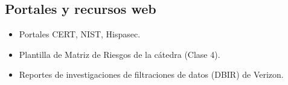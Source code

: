 \documentclass[11pt,a4paper]{article}
\begin{document}
\subsection{Portales y recursos web}
\begin{itemize}[leftmargin=*]
  \item Portales CERT, NIST, Hispasec.
  \item Plantilla de Matriz de Riesgos de la cátedra (Clase 4).
  \item Reportes de investigaciones de filtraciones de datos (DBIR) de Verizon.
\end{itemize}
\end{document}
